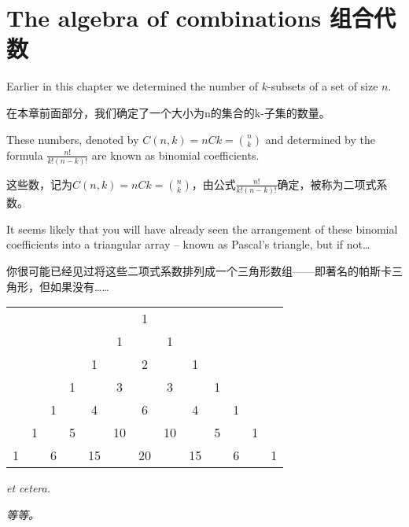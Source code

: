 \clearpage





\clearpage

\section{The algebra of combinations 组合代数}
\label{sec:alg_comb}

Earlier in this chapter we determined the number of $k$-subsets of a set
of size $n$.

在本章前面部分，我们确定了一个大小为n的集合的k-子集的数量。

These numbers, denoted by $C(n,k) = nCk = \binom{n}{k}$
and determined by the formula $\frac{n!}{k!(n-k)!}$ are known as binomial 
coefficients.

这些数，记为$C(n,k) = nCk = \binom{n}{k}$，由公式$\frac{n!}{k!(n-k)!}$确定，被称为二项式系数。

It seems likely that you will have already seen the arrangement
of these binomial coefficients into a triangular array -- known as 
 Pascal's triangle, but if not\ldots

你很可能已经见过将这些二项式系数排列成一个三角形数组——即著名的帕斯卡三角形，但如果没有……

\begin{center}
\begin{tabular}{ccccccccccccc}
  &   &   &   &    &    & 1  &    &    &   &   &   &   \\
  &   &   &   &    & 1  &    & 1  &    &   &   &   &   \\
  &   &   &   &  1 &    & 2  &    & 1  &   &   &   &   \\
  &   &   & 1 &    & 3  &    & 3  &    & 1 &   &   &   \\
  &   & 1 &   &  4 &    & 6  &    & 4  &   & 1 &   &   \\
  & 1 &   & 5 &    & 10 &    & 10 &    & 5 &   & 1 &   \\
1 &   & 6 &   & 15 &    & 20 &    & 15 &   & 6 &   & 1 \\
\end{tabular}
\end{center}

\noindent \emph{et cetera.}

\noindent \emph{等等。}

